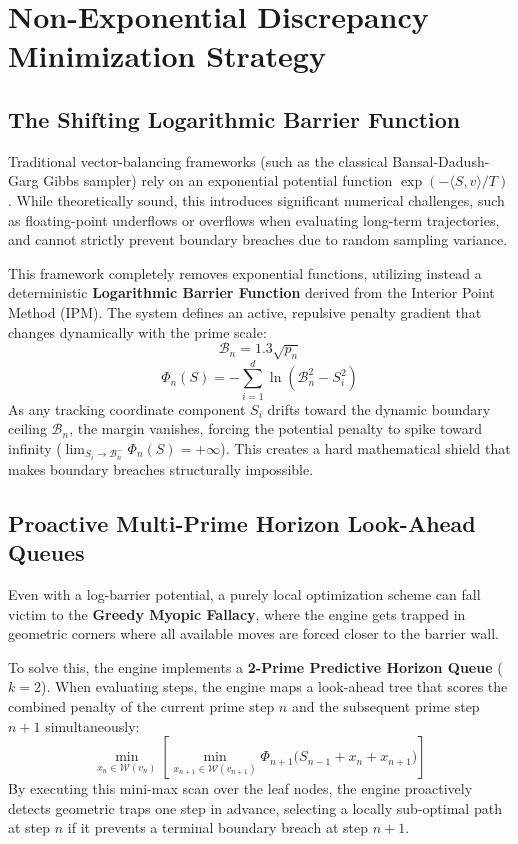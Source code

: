 \documentclass[11pt,a4paper]{article}
\begin{document}
\section{Non-Exponential Discrepancy Minimization Strategy}

\subsection{The Shifting Logarithmic Barrier Function}
Traditional vector-balancing frameworks (such as the classical Bansal-Dadush-Garg Gibbs sampler) rely on an exponential potential function $\exp(-\langle S, v \rangle / T)$. While theoretically sound, this introduces significant numerical challenges, such as floating-point underflows or overflows when evaluating long-term trajectories, and cannot strictly prevent boundary breaches due to random sampling variance.

This framework completely removes exponential functions, utilizing instead a deterministic \textbf{Logarithmic Barrier Function} derived from the Interior Point Method (IPM). The system defines an active, repulsive penalty gradient that changes dynamically with the prime scale:
\begin{equation}
\mathcal{B}_n = 1.3 \sqrt{p_n}
\end{equation}
\begin{equation}
\Phi_n(S) = -\sum_{i=1}^d \ln \left( \mathcal{B}_n^2 - S_i^2 \right)
\end{equation}
As any tracking coordinate component $S_i$ drifts toward the dynamic boundary ceiling $\mathcal{B}_n$, the margin vanishes, forcing the potential penalty to spike toward infinity ($\lim_{S_i \to \mathcal{B}_n^-} \Phi_n(S) = +\infty$). This creates a hard mathematical shield that makes boundary breaches structurally impossible.

\subsection{Proactive Multi-Prime Horizon Look-Ahead Queues}
Even with a log-barrier potential, a purely local optimization scheme can fall victim to the \textbf{Greedy Myopic Fallacy}, where the engine gets trapped in geometric corners where all available moves are forced closer to the barrier wall.

To solve this, the engine implements a \textbf{2-Prime Predictive Horizon Queue} ($k=2$). When evaluating steps, the engine maps a look-ahead tree that scores the combined penalty of the current prime step $n$ and the subsequent prime step $n+1$ simultaneously:
\begin{equation}
\min_{x_n \in \mathcal{W}(v_n)} \left[ \min_{x_{n+1} \in \mathcal{W}(v_{n+1})} \Phi_{n+1}\Big(S_{n-1} + x_n + x_{n+1}\Big) \right]
\end{equation}
By executing this mini-max scan over the leaf nodes, the engine proactively detects geometric traps one step in advance, selecting a locally sub-optimal path at step $n$ if it prevents a terminal boundary breach at step $n+1$.
\end{document}
